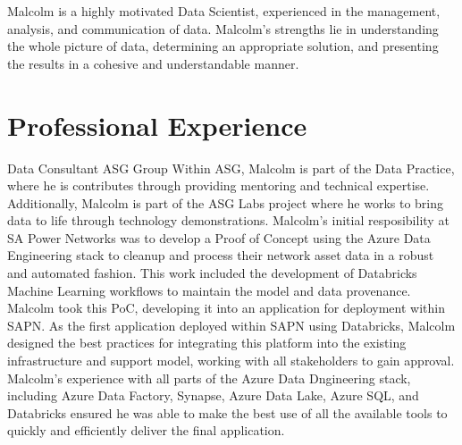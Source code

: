 



\makecvtitle{}
\vspace{-4em}

Malcolm is a highly motivated Data Scientist,
experienced in the management, analysis, and communication of data.
Malcolm’s strengths lie in understanding the whole picture of data,
determining an appropriate solution,
and presenting the results in a cohesive and understandable manner.

\section{Professional Experience}

{Data Consultant}
{ASG Group}{}{}
{%
  Within ASG, Malcolm is part of the Data Practice, where he is contributes
  through providing mentoring and technical expertise. Additionally, Malcolm is
  part of the ASG Labs project where he works to bring data to life through
  technology demonstrations.
  Malcolm’s initial resposibility at SA Power Networks was to develop a Proof
  of Concept using the Azure Data Engineering stack to cleanup and process
  their network asset data in a robust and automated fashion. This work
  included the development of Databricks Machine Learning workflows to maintain
  the model and data provenance.
  Malcolm took this PoC, developing it into an application for deployment within
  SAPN. As the first application deployed within SAPN using Databricks, Malcolm
  designed the best practices for integrating this platform into the existing
  infrastructure and support model, working with all stakeholders to gain
  approval. Malcolm’s experience with all parts of the Azure Data Dngineering
  stack, including Azure Data Factory, Synapse, Azure Data Lake, Azure SQL, and
  Databricks ensured he was able to make the best use of all the available tools
  to quickly and efficiently deliver the final application.
}

